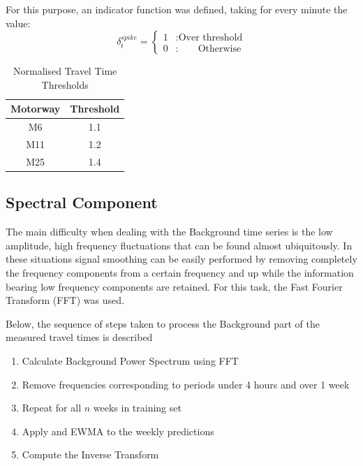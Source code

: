 \documentclass[conference]{IEEEtran}
\begin{document}
For this purpose, an indicator function was defined, taking for every minute the value:\\
\begin{equation}
\delta_t^{spike}= \left\{
\begin{array}{lr}
1 & : \textrm{Over threshold}\\
0 & : \,\,\,\,\,\,\,\,\,\,\,\,\textrm{Otherwise}
\end{array}
\right.
\label{eq:delta}
\end{equation}

\begin{table}[htbp]
	\caption{Normalised Travel Time Thresholds}
	\begin{center}
		\begin{tabular}{|c|c|}
			\hline
			\textbf{Motorway}&{\textbf{Threshold}} \\
			\hline
			M6& 1.1\\
			\hline
			M11& 1.2\\
			\hline
			M25& 1.4\\
			\hline
		\end{tabular}
		\label{tab1}
	\end{center}
\end{table}

\subsection{Spectral Component}
The main difficulty when dealing with the Background time series is the low amplitude, high frequency fluctuations that can be found almost ubiquitously. 
In these situations signal smoothing can be easily performed by removing completely the frequency components from a certain frequency and up while the information bearing low frequency components are retained. For this task, the Fast Fourier Transform (FFT) \cite{FFT} was used.

Below, the sequence of steps taken to process the Background part of the measured travel times is described
\begin{enumerate}

	\item Calculate Background Power Spectrum using FFT
	\item Remove frequencies corresponding to periods under 4 hours and over 1 week
	\item Repeat for all $n$ weeks in training set
    \item Apply and EWMA to the weekly predictions
	\item Compute the Inverse Transform

\end{enumerate}
\end{document}
